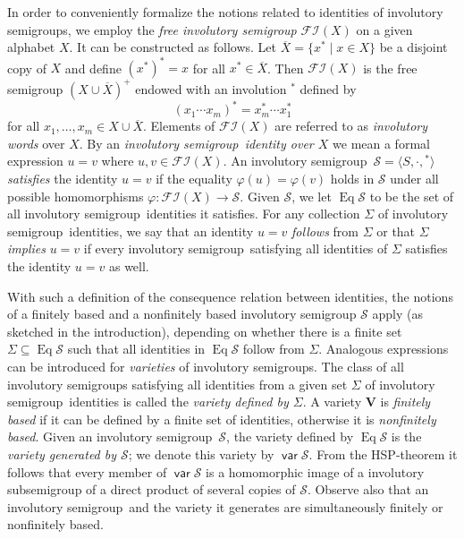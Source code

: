 \documentclass[preprint,1p,times]{elsarticle}
\DeclareMathOperator{\var}{\mathsf{var}}
\DeclareMathOperator{\Id}{Eq}
\numberwithin{equation}{section}
\theoremstyle{remark}
\def\cal{\mathcal}
\def\Sc{{\cal S}}
\def\Vc{\mathbf{V}}
\def\Si{\Sigma}
\def\sm{semi\-group}
\def\FI{\ensuremath{\mathcal{FI}}}
\begin{document}
In order to conveniently formalize the notions related to identities of involutory semigroups, we employ the \emph{free
involutory semigroup} $\FI(X)$ on a given alphabet $X$. It can be constructed as follows.  Let $\overline{X}=\{x^*\mid
x\in X\}$ be a disjoint copy of $X$ and define $(x^*)^*=x$ for all $x^*\in \overline{X}$. Then $\FI(X)$ is the free
semigroup $(X\cup\overline{X})^+$ endowed with an involution ${}^*$ defined by
$$(x_1\cdots x_m)^* = x_m^*\cdots x_1^*$$
for all $x_1,\dots,x_m\in X\cup \overline{X}$. Elements of $\FI(X)$ are referred to as \emph{involutory words} over
$X$. By an \emph{involutory \sm\ identity over $X$} we mean a formal expression $u=v$ where $u,v\in\FI(X)$. An
involutory \sm\ $\mathcal{S}=\langle S,\cdot,{}^*\rangle$ \emph{satisfies} the identity $u=v$ if the equality
$\varphi(u)=\varphi(v)$ holds in $\mathcal{S}$ under all possible homomorphisms $\varphi:\FI(X) \to\mathcal{S}$. Given
$\mathcal{S}$, we let $\Id \mathcal{S}$ to be the set of all involutory \sm\ identities it satisfies. For any
collection $\Sigma$ of involutory \sm\ identities, we say that an identity $u=v$ \emph{follows} from $\Sigma$ or that
$\Sigma$ \emph{implies} $u=v$ if every involutory \sm\ satisfying all identities of $\Sigma$ satisfies the identity
$u=v$ as well.

With such a definition of the consequence relation between identities, the notions of a finitely based and a
nonfinitely based involutory semigroup $\mathcal{S}$ apply (as sketched in the introduction), depending on whether
there is a finite set $\Si\subseteq\Id \mathcal{S}$ such that all identities in $\Id \mathcal{S}$ follow from $\Si$.
Analogous expressions can be introduced for \emph{varieties} of involutory semigroups. The class of all involutory
semigroups satisfying all identities from a given set $\Sigma$ of involutory \sm\ identities is called the
\emph{variety defined by $\Sigma$}. A variety $\Vc$ is \emph{finitely based} if it can be defined by a finite set of
identities, otherwise it is \emph{nonfinitely based}. Given an involutory \sm\ $\mathcal{S}$, the variety defined by
$\Id\Sc$ is the \emph{variety generated by $\Sc$}; we denote this variety by $\var\Sc$. From the HSP-theorem it follows
that every member of $\var\Sc$ is a homomorphic image of a involutory subsemigroup of a direct product of several
copies of $\Sc$. Observe also that an involutory \sm\ and the variety it generates are simultaneously finitely or
nonfinitely based.
\end{document}
